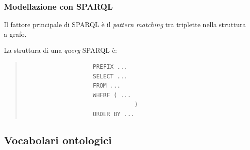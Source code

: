 			\subsubsection{Modellazione con SPARQL}		
				Il fattore principale di SPARQL è il \emph{pattern matching} tra triplette nella struttura a grafo. 
				
				La struttura di una \emph{query} SPARQL è:
				\begin{quote}
				\begin{verbatim}
					PREFIX ...
					SELECT ...
					FROM ...
					WHERE ( ...
								)
					ORDER BY ...					
				\end{verbatim}					
				\end{quote}					
				
		\subsection{Vocabolari ontologici}
		
